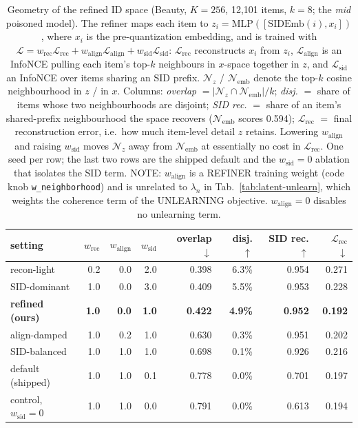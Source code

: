 
\begin{table}[t]
\centering
\small
\caption{Geometry of the refined ID space (Beauty, $K{=}256$, 12{,}101 items, $k{=}8$; the \emph{mid} poisoned model). The refiner maps each item to $z_i=\mathrm{MLP}([\mathrm{SIDEmb}(i), x_i])$, where $x_i$ is the pre-quantization embedding, and is trained with $\mathcal{L}=w_{\text{rec}}\mathcal{L}_{\text{rec}}+w_{\text{align}}\mathcal{L}_{\text{align}}+w_{\text{sid}}\mathcal{L}_{\text{sid}}$: $\mathcal{L}_{\text{rec}}$ reconstructs $x_i$ from $z_i$, $\mathcal{L}_{\text{align}}$ is an InfoNCE pulling each item's top-$k$ neighbours in $x$-space together in $z$, and $\mathcal{L}_{\text{sid}}$ an InfoNCE over items sharing an SID prefix. $\mathcal{N}_z$ / $\mathcal{N}_{\text{emb}}$ denote the top-$k$ cosine neighbourhood in $z$ / in $x$. Columns: \emph{overlap} $=|\mathcal{N}_z\cap\mathcal{N}_{\text{emb}}|/k$; \emph{disj.} $=$ share of items whose two neighbourhoods are disjoint; \emph{SID rec.} $=$ share of an item's shared-prefix neighbourhood the space recovers ($\mathcal{N}_{\text{emb}}$ scores 0.594); $\mathcal{L}_{\text{rec}}$ $=$ final reconstruction error, i.e.\ how much item-level detail $z$ retains. Lowering $w_{\text{align}}$ and raising $w_{\text{sid}}$ moves $\mathcal{N}_z$ away from $\mathcal{N}_{\text{emb}}$ at essentially no cost in $\mathcal{L}_{\text{rec}}$. One seed per row; the last two rows are the shipped default and the $w_{\text{sid}}{=}0$ ablation that isolates the SID term. NOTE: $w_{\text{align}}$ is a REFINER training weight (code knob \texttt{w\_neighborhood}) and is unrelated to $\lambda_n$ in Tab.~\ref{tab:latent-unlearn}, which weights the coherence term of the UNLEARNING objective. $w_{\text{align}}{=}0$ disables no unlearning term.}
\label{tab:latent-geometry}
\begin{tabular}{lrrrrrrr}
\toprule
setting & $w_{\text{rec}}$ & $w_{\text{align}}$ & $w_{\text{sid}}$ & overlap $\downarrow$ & disj. $\uparrow$ & SID rec. $\uparrow$ & $\mathcal{L}_{\text{rec}}$ $\downarrow$ \\
\midrule
recon-light & 0.2 & 0.0 & 2.0 & 0.398 & 6.3\% & 0.954 & 0.271 \\
SID-dominant & 1.0 & 0.0 & 3.0 & 0.409 & 5.5\% & 0.953 & 0.228 \\
\textbf{refined (ours)} & \textbf{1.0} & \textbf{0.0} & \textbf{1.0} & \textbf{0.422} & \textbf{4.9\%} & \textbf{0.952} & \textbf{0.192} \\
align-damped & 1.0 & 0.2 & 1.0 & 0.630 & 0.3\% & 0.951 & 0.202 \\
SID-balanced & 1.0 & 1.0 & 1.0 & 0.698 & 0.1\% & 0.926 & 0.216 \\
\midrule
default (shipped) & 1.0 & 1.0 & 0.1 & 0.778 & 0.0\% & 0.701 & 0.197 \\
control, $w_{\text{sid}}{=}0$ & 1.0 & 1.0 & 0.0 & 0.791 & 0.0\% & 0.613 & 0.194 \\
\bottomrule
\end{tabular}
\end{table}



